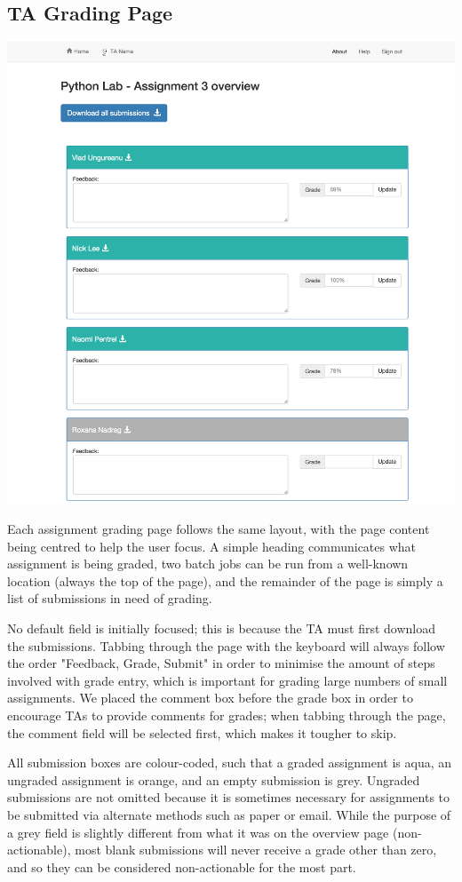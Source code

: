 \subsection{TA Grading Page}

\includegraphics[width=\textwidth]{screenshots/GradingAssignmentOverview.png}

Each assignment grading page follows the same layout, with the page content being centred to help the user focus. A simple heading communicates what assignment is being graded, two batch jobs can be run from a well-known location (always the top of the page), and the remainder of the page is simply a list of submissions in need of grading. 

No default field is initially focused; this is because the TA must first download the submissions. Tabbing through the page with the keyboard will always follow the order "Feedback, Grade, Submit" in order to minimise the amount of steps involved with grade entry, which is important for grading large numbers of small assignments. We placed the comment box before the grade box in order to encourage TAs to provide comments for grades; when tabbing through the page, the comment field will be selected first, which makes it tougher to skip.

All submission boxes are colour-coded, such that a graded assignment is aqua, an ungraded assignment is orange, and an empty submission is grey. Ungraded submissions are not omitted because it is sometimes necessary for assignments to be submitted via alternate methods such as paper or email. While the purpose of a grey field is slightly different from what it was on the overview page (non-actionable), most blank submissions will never receive a grade other than zero, and so they can be considered non-actionable for the most part. 

